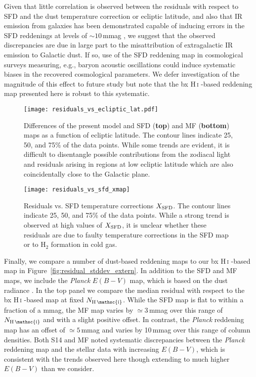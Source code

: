 \documentclass[iop,apj]{emulateapj}
\makeatletter
\def\testbx{bx}%
\DeclareRobustCommand{\ion}[2]{%
\relax\ifmmode
\ifx\testbx\f@series
{\mathbf{#1\,\mathsc{#2}}}\else
{\mathrm{#1\,\mathsc{#2}}}\fi
\else\textup{#1\,{\mdseries\textsc{#2}}}%
\fi}
\makeatother
\begin{document}
Given that little correlation is observed between the residuals with respect to SFD and the dust temperature correction or ecliptic latitude, and also that IR emission from galaxies has been demonstrated capable of inducing errors in the SFD reddenings at levels of $\sim 10$\,mmag \citep{Yahata+etal_2007}, we suggest that the observed discrepancies are due in large part to the misattribution of extragalactic IR emission to Galactic dust. If so, use of the SFD reddening map in cosmological surveys measuring, e.g., baryon acoustic oscillations could induce systematic biases in the recovered cosmological parameters. We defer investigation of the magnitude of this effect to future study but note that the \ion{H}{i}-based reddening map presented here is robust to this systematic.

\begin{figure}[tp]
	\texttt{[image: residuals\_vs\_ecliptic\_lat.pdf]}
	\caption{Differences of the present model and SFD ({\bf top}) and MF ({\bf bottom}) maps as a function of ecliptic latitude. The contour lines indicate 25, 50, and 75\% of the data points. While some trends are evident, it is difficult to disentangle possible contributions from the zodiacal light and residuals arising in regions at low ecliptic latitude which are also coincidentally close to the Galactic plane.}
	\label{fig:residuals_vs_ecliptic_latitude}
\end{figure}

\begin{figure}[tp]
	\texttt{[image: residuals\_vs\_sfd\_xmap]}
	\caption{Residuals vs. SFD temperature corrections $X_{\rm SFD}$. The contour lines indicate 25, 50, and 75\% of the data points. While a strong trend is observed at high values of $X_{\rm SFD}$, it is unclear whether these residuals are due to faulty temperature corrections in the SFD map or to H$_2$ formation in cold gas.}
	\label{fig:residuals_vs_xmap}
\end{figure}

Finally, we compare a number of dust-based reddening maps to our \ion{H}{i}-based map in Figure~\ref{fig:residual_stddev_extern}. In addition to the SFD and MF maps, we include the {\it Planck} $E(B-V)$ map, which is based on the dust radiance \citep{Planck_2013_XI}. In the top panel we compare the median residual with respect to the \ion{H}{i}-based map at fixed $N_\ion{H}{i}$. While the SFD map is flat to within a fraction of a mmag, the MF map varies by $\simeq 3$\,mmag over this range of $N_\ion{H}{i}$ and with a slight positive offset. In contrast, the {\it Planck} reddening map has an offset of $\simeq 5$\,mmag and varies by 10\,mmag over this range of column densities. Both S14 and MF noted systematic discrepancies between the {\it Planck} reddening map and the stellar data with increasing $E(B-V)$, which is consistent with the trends observed here though extending to much higher $E(B-V)$ than we consider.
\end{document}
